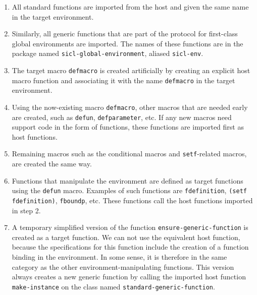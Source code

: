\begin{enumerate}
\item All standard \commonlisp{} functions are imported from the host
  and given the same name in the target environment.
\item Similarly, all generic functions that are part of the protocol
  for first-class global environments are imported.  The names of
  these functions are in the package named
  \texttt{sicl-global-environment}, aliased \texttt{sicl-env}.
\item The target macro \texttt{defmacro} is created artificially by
  creating an explicit host macro function and associating it with the
  name \texttt{defmacro} in the target environment.
\item Using the now-existing macro \texttt{defmacro}, other macros
  that are needed early are created, such as \texttt{defun},
  \texttt{defparameter}, etc.  If any new macros need support code in
  the form of functions, these functions are imported first as host
  functions.
\item Remaining macros such as the conditional macros and
  \texttt{setf}-related macros, are created the same way.
\item Functions that manipulate the environment are defined as target
  functions using the \texttt{defun} macro.  Examples of such
  functions are \texttt{fdefinition}, \texttt{(setf fdefinition)},
  \texttt{fboundp}, etc.  These functions call the host functions
  imported in step 2.
\item A temporary simplified version of the function
  \texttt{ensure-generic-function} is created as a target function.
  We can not use the equivalent host function, because the
  specifications for this function include the creation of a function
  binding in the environment.  In some sense, it is therefore in the
  same category as the other environment-manipulating functions.  This
  version always creates a new generic function by calling the
  imported host function \texttt{make-instance} on the class named
  \texttt{standard-generic-function}.
\end{enumerate}
